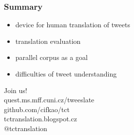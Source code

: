 \documentclass[12pt]{beamer}
\begin{document}
\begin{frame}
	\frametitle{Summary}
	\begin{itemize}
		\item \textcolor{TCTwhite}{\Large device for human translation of tweets}
		\item \textcolor{TCTwhite}{\Large translation evaluation}
		\item \textcolor{TCTwhite}{\Large parallel corpus as a goal}
		\item \textcolor{TCTwhite}{\Large difficulties of tweet understanding}
	\end{itemize}
\end{frame}

\begin{frame}
	\begin{center}
		\textcolor{TCTsilver}{\Huge Join us!}
		\\[0.9cm]
		\textcolor{TCTsilver}{\Huge quest.ms.mff.cuni.cz/tweeslate}
		\\[0.3cm]
		\textcolor{TCTsilver}{\Huge github.com/cifkao/tct }
		\\[0.3cm]
		\textcolor{TCTsilver}{\Huge tctranslation.blogspot.cz}
		\\[0.3cm]
		\textcolor{TCTsilver}{\Huge $@$tctranslation}
	\end{center}
\end{frame}
\end{document}
